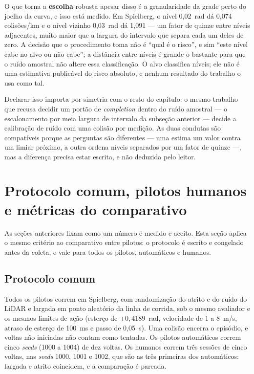 O que torna a \textbf{escolha} robusta apesar disso é a granularidade da grade
perto do joelho da curva, e isso está medido. Em Spielberg, o nível 0,02~rad dá
0,074 colisões/km e o nível vizinho 0,03~rad dá 1,091 --- um fator de quinze entre
níveis adjacentes, muito maior que a largura do intervalo que separa cada um deles
de zero. A decisão que o procedimento toma não é ``qual é o risco'', e sim ``este
nível cabe no alvo ou não cabe''; a distância entre níveis é grande o bastante para
que o ruído amostral não altere essa classificação. O alvo classifica níveis; ele
não é uma estimativa publicável do risco absoluto, e nenhum resultado do trabalho o
usa como tal.

Declarar isso importa por simetria com o resto do capítulo: o mesmo trabalho que
recusa decidir um portão de \textit{completion} dentro do ruído amostral --- o
escalonamento por meia largura de intervalo da subseção anterior --- decide a
calibração de ruído com uma colisão por medição. As duas condutas são
compatíveis porque as perguntas são diferentes --- uma estima um valor contra um
limiar próximo, a outra ordena níveis separados por um fator de quinze ---, mas a
diferença precisa estar escrita, e não deduzida pelo leitor.

\section{Protocolo comum, pilotos humanos e métricas do comparativo}\label{sec:val-humano}

As seções anteriores fixam como um número é medido e aceito. Esta seção aplica o
mesmo critério ao comparativo entre pilotos: o protocolo é escrito e congelado
antes da coleta, e vale para todos os pilotos, automáticos e humanos.

\subsection{Protocolo comum}

Todos os pilotos correm em Spielberg, com randomização do atrito e do ruído do
LiDAR e largada em ponto aleatório da linha de corrida, sob o mesmo avaliador e os
mesmos limites de ação (esterço de $\pm 0{,}4189$~rad, velocidade de 1 a 8~m/s,
atraso de esterço de 100~ms e passo de 0,05~s). Uma colisão encerra o episódio, e
voltas não iniciadas não contam como tentadas. Os pilotos automáticos correm cinco
\textit{seeds} (1000 a 1004) de dez voltas. Os humanos correm três sessões
de cinco voltas, nas \textit{seeds} 1000, 1001 e 1002, que são as três primeiras
dos automáticos: largada e atrito coincidem, e a comparação é pareada.

